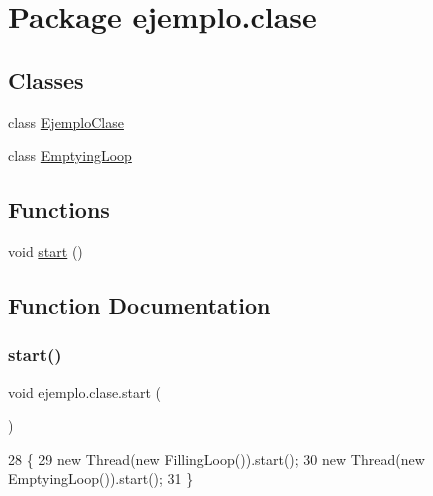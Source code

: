 \hypertarget{namespaceejemplo_1_1clase}{}\section{Package ejemplo.\+clase}
\label{namespaceejemplo_1_1clase}
\subsection*{Classes}
\begin{DoxyCompactItemize}
\item 
class \mbox{\hyperlink{classejemplo_1_1clase_1_1_ejemplo_clase}{Ejemplo\+Clase}}
\item 
class \mbox{\hyperlink{classejemplo_1_1clase_1_1_emptying_loop}{Emptying\+Loop}}
\end{DoxyCompactItemize}
\subsection*{Functions}
\begin{DoxyCompactItemize}
\item 
void \mbox{\hyperlink{namespaceejemplo_1_1clase_abcf43191f0ecf3b071ca2db7696ba821}{start}} ()
\end{DoxyCompactItemize}


\subsection{Function Documentation}
\mbox{\label{namespaceejemplo_1_1clase_abcf43191f0ecf3b071ca2db7696ba821}} 
\subsubsection{\texorpdfstring{start()}{start()}}
{\footnotesize\ttfamily void ejemplo.\+clase.\+start (\begin{DoxyParamCaption}{ }\end{DoxyParamCaption})\hspace{0.3cm}{\ttfamily [package]}}


\begin{DoxyCode}
28  \{
29  \textcolor{keyword}{new} Thread(\textcolor{keyword}{new} FillingLoop()).start();
30  \textcolor{keyword}{new} Thread(\textcolor{keyword}{new} EmptyingLoop()).start();
31  \}
\end{DoxyCode}
